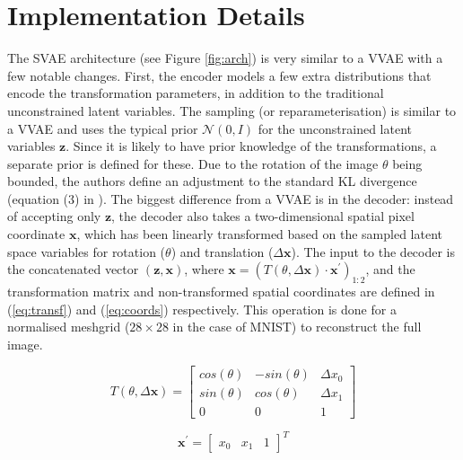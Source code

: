 \section{Implementation Details} \label{impl}

The SVAE architecture (see Figure \ref{fig:arch}) is very similar to a VVAE with a few notable changes. First, the encoder models a few extra distributions that encode the transformation parameters, in addition to the traditional unconstrained latent variables. The sampling (or reparameterisation) is similar to a VVAE and uses the typical prior $\mathcal{N}(0, I)$ for the unconstrained latent variables $\textbf{z}$. Since it is likely to have prior knowledge of the transformations, a separate prior is defined for these. Due to the rotation of the image $\theta$ being bounded, the authors define an adjustment to the standard KL divergence (equation (3) in \cite{bepler2019spatialvae}). The biggest difference from a VVAE is in the decoder: instead of accepting only $\textbf{z}$, the decoder also takes a two-dimensional spatial pixel coordinate $\textbf{x}$, which has been linearly transformed based on the sampled latent space variables for rotation ($\theta$) and translation ($\Delta \textbf{x}$). The input to the decoder is the concatenated vector $(\textbf{z}, \textbf{x})$, where $\textbf{x} = (T(\theta, \Delta \textbf{x}) \cdot \textbf{x}^{\prime})_{1:2}$, and the transformation matrix and non-transformed spatial coordinates are defined in (\ref{eq:transf}) and (\ref{eq:coords}) respectively. This operation is done for a normalised meshgrid ($28 \times 28$ in the case of MNIST) to reconstruct the full image.

\begin{equation}
\label{eq:transf}
T(\theta, \Delta \textbf{x}) = 
\begin{bmatrix}
cos(\theta) & -sin(\theta) & \Delta x_0\\
sin(\theta) & cos(\theta) & \Delta x_1\\
0 & 0 & 1
\end{bmatrix}
\end{equation}

\begin{equation}
\label{eq:coords}
\textbf{x}^{\prime} = 
\begin{bmatrix}
x_0 & x_1 & 1
\end{bmatrix}^T
\end{equation}

